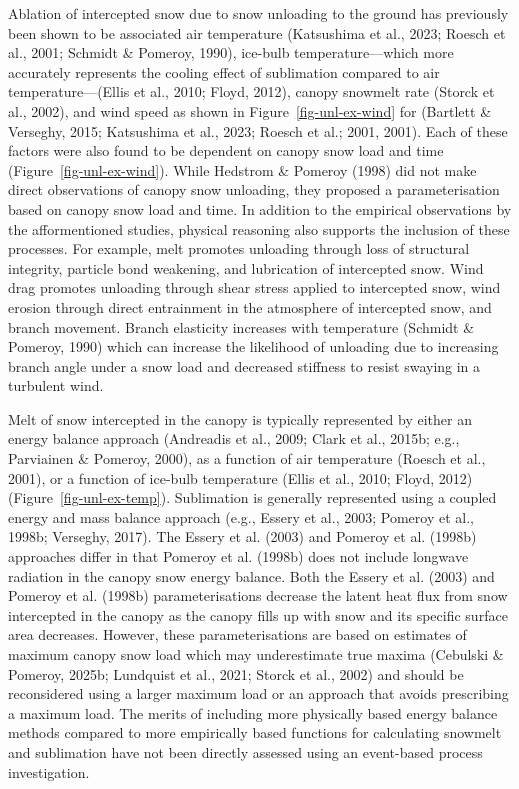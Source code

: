 \documentclass[
  letterpaper,
]{tex/uofsthesis-cs}
\begin{document}
Ablation of intercepted snow due to snow unloading to the ground has
previously been shown to be associated air temperature (Katsushima et
al., 2023; Roesch et al., 2001; Schmidt \& Pomeroy, 1990), ice-bulb
temperature---which more accurately represents the cooling effect of
sublimation compared to air temperature---(Ellis et al., 2010; Floyd,
2012), canopy snowmelt rate (Storck et al., 2002), and wind speed as
shown in Figure~\ref{fig-unl-ex-wind} for (Bartlett \& Verseghy, 2015;
Katsushima et al., 2023; Roesch et al.; 2001, 2001). Each of these
factors were also found to be dependent on canopy snow load and time
(Figure~\ref{fig-unl-ex-wind}). While Hedstrom \& Pomeroy (1998) did not
make direct observations of canopy snow unloading, they proposed a
parameterisation based on canopy snow load and time. In addition to the
empirical observations by the afformentioned studies, physical reasoning
also supports the inclusion of these processes. For example, melt
promotes unloading through loss of structural integrity, particle bond
weakening, and lubrication of intercepted snow. Wind drag promotes
unloading through shear stress applied to intercepted snow, wind erosion
through direct entrainment in the atmosphere of intercepted snow, and
branch movement. Branch elasticity increases with temperature (Schmidt
\& Pomeroy, 1990) which can increase the likelihood of unloading due to
increasing branch angle under a snow load and decreased stiffness to
resist swaying in a turbulent wind.

Melt of snow intercepted in the canopy is typically represented by
either an energy balance approach (Andreadis et al., 2009; Clark et al.,
2015b; e.g., Parviainen \& Pomeroy, 2000), as a function of air
temperature (Roesch et al., 2001), or a function of ice-bulb temperature
(Ellis et al., 2010; Floyd, 2012) (Figure~\ref{fig-unl-ex-temp}).
Sublimation is generally represented using a coupled energy and mass
balance approach (e.g., Essery et al., 2003; Pomeroy et al., 1998b;
Verseghy, 2017). The Essery et al. (2003) and Pomeroy et al. (1998b)
approaches differ in that Pomeroy et al. (1998b) does not include
longwave radiation in the canopy snow energy balance. Both the Essery et
al. (2003) and Pomeroy et al. (1998b) parameterisations decrease the
latent heat flux from snow intercepted in the canopy as the canopy fills
up with snow and its specific surface area decreases. However, these
parameterisations are based on estimates of maximum canopy snow load
which may underestimate true maxima (Cebulski \& Pomeroy, 2025b;
Lundquist et al., 2021; Storck et al., 2002) and should be reconsidered
using a larger maximum load or an approach that avoids prescribing a
maximum load. The merits of including more physically based energy
balance methods compared to more empirically based functions for
calculating snowmelt and sublimation have not been directly assessed
using an event-based process investigation.
\end{document}
